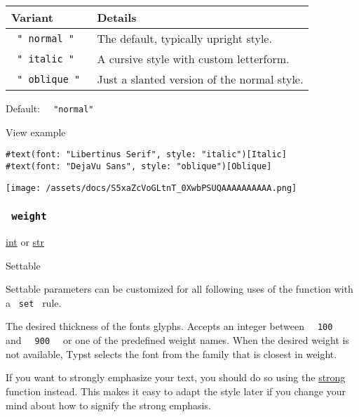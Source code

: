 \begin{longtable}[]{@{}ll@{}}
\toprule\noalign{}
Variant & Details \\
\midrule\noalign{}
\endhead
\bottomrule\noalign{}
\endlastfoot
\texttt{\ "\ normal\ "\ } & The default, typically upright style. \\
\texttt{\ "\ italic\ "\ } & A cursive style with custom letterform. \\
\texttt{\ "\ oblique\ "\ } & Just a slanted version of the normal
style. \\
\end{longtable}

Default: \texttt{\ }{\texttt{\ "normal"\ }}\texttt{\ }


View example

\begin{verbatim}
#text(font: "Libertinus Serif", style: "italic")[Italic]
#text(font: "DejaVu Sans", style: "oblique")[Oblique]
\end{verbatim}

\texttt{[image: /assets/docs/S5xaZcVoGLtnT\_0XwbPSUQAAAAAAAAAA.png]}

\subsubsection{\texorpdfstring{\texttt{\ weight\ }}{ weight }}\label{parameters-weight}

\href{/docs/reference/foundations/int/}{int} {or}
\href{/docs/reference/foundations/str/}{str}

{{ Settable }}

\label{parameters-weight-settable-tooltip}
Settable parameters can be customized for all following uses of the
function with a \texttt{\ set\ } rule.

The desired thickness of the font\textquotesingle s glyphs. Accepts an
integer between \texttt{\ }{\texttt{\ 100\ }}\texttt{\ } and
\texttt{\ }{\texttt{\ 900\ }}\texttt{\ } or one of the predefined weight
names. When the desired weight is not available, Typst selects the font
from the family that is closest in weight.

If you want to strongly emphasize your text, you should do so using the
\href{/docs/reference/model/strong/}{strong} function instead. This
makes it easy to adapt the style later if you change your mind about how
to signify the strong emphasis.

